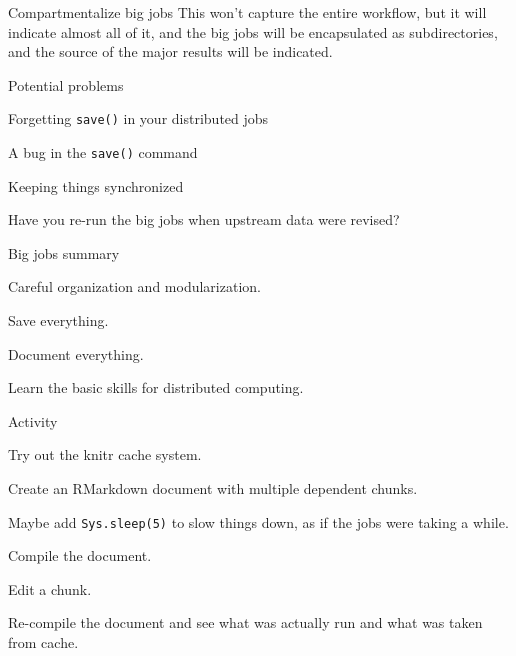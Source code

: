 \documentclass[12pt,t]{beamer}
\begin{document}
{\begin{frame}{Compartmentalize big jobs}
{  This won't capture the entire workflow, but it will indicate
  almost all of it, and the big jobs will be encapsulated as
  subdirectories, and the source of the major results will be
  indicated.
}
\end{frame}


\begin{frame}{Potential problems}

\bbi
\item Forgetting {\tt save()} in your distributed jobs
\item A bug in the {\tt save()} command
\item Keeping things synchronized
  \bi
  \item Have you re-run the big jobs when upstream data were revised?
  \ei
\ei

\end{frame}





\begin{frame}{Big jobs summary}

\bbi
\item Careful organization and modularization.
\item Save everything.
\item Document everything.
\item Learn the basic skills for distributed computing.
\ei

\end{frame}



\begin{frame}[c]{Activity}

Try out the knitr cache system.

  \bi
      \item Create an RMarkdown document with multiple dependent
        chunks.
      \item Maybe add {\tt Sys.sleep(5)} to slow things down, as if
        the jobs were taking a while.
      \item Compile the document.
      \item Edit a chunk.
      \item Re-compile the document and see what was actually run and
        what was taken from cache.
  \ei


\end{frame}}
\end{document}
